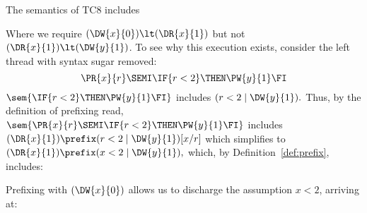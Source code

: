 The semantics of TC8 includes
\begin{tikzdisplay}[node distance=1em]
\end{tikzdisplay}
Where we require $(\DW{x}{0})\lt(\DR{x}{1})$ but not $(\DR{x}{1})\lt(\DW{y}{1})$.
To see why this execution exists, consider the left thread with syntax sugar
removed:
\begin{displaymath}
  \PR{x}{r}\SEMI \IF{r<2}\THEN \PW{y}{1}\FI
\end{displaymath}
\begin{math}
  \sem{\IF{r<2}\THEN \PW{y}{1}\FI}
\end{math}
includes
\begin{math}
  (r<2\mid\DW{y}{1}).
\end{math}
Thus, by the definition of prefixing read,
\begin{math}
  \sem{\PR{x}{r}\SEMI \IF{r<2}\THEN \PW{y}{1}\FI}
\end{math}
includes
\begin{math}
  (\DR{x}{1}) \prefix (r<2\mid\DW{y}{1})[x/r]
\end{math}
which simplifies to
\begin{math}
  (\DR{x}{1}) \prefix (x<2\mid\DW{y}{1}),
\end{math}
which, by Definition~\ref{def:prefix}, includes:
\begin{tikzdisplay}[node distance=1em,baselinecenter]
  \end{tikzdisplay}

Prefixing with $(\DW{x}{0})$ allows us to discharge the assumption $x<2$,
arriving at:
\begin{tikzdisplay}[node distance=1em,baselinecenter]
  \end{tikzdisplay}

